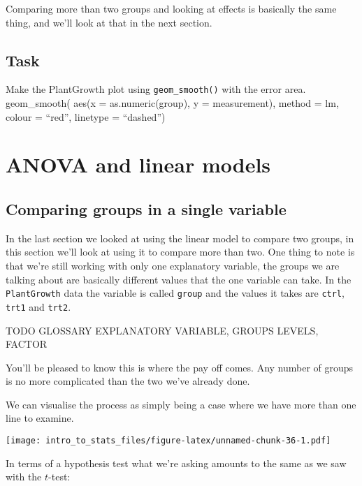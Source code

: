 \documentclass[]{book}
\begin{document}
Comparing more than two groups and looking at effects is basically the same thing, and we'll look at that in the next section.

\hypertarget{task}{%
\section{Task}\label{task}}

Make the PlantGrowth plot using \texttt{geom\_smooth()} with the error area.
geom\_smooth( aes(x = as.numeric(group), y = measurement), method = lm, colour = ``red'', linetype = ``dashed'')

\hypertarget{anova-and-linear-models}{%
\chapter{ANOVA and linear models}\label{anova-and-linear-models}}

\hypertarget{comparing-groups-in-a-single-variable}{%
\section{Comparing groups in a single variable}\label{comparing-groups-in-a-single-variable}}

In the last section we looked at using the linear model to compare two groups, in this section we'll look at using it to compare more than two. One thing to note is that we're still working with only one explanatory variable, the groups we are talking about are basically different values that the one variable can take. In the \texttt{PlantGrowth} data the variable is called \texttt{group} and the values it takes are \texttt{ctrl}, \texttt{trt1} and \texttt{trt2}.

TODO GLOSSARY EXPLANATORY VARIABLE, GROUPS LEVELS, FACTOR

You'll be pleased to know this is where the pay off comes. Any number of groups is no more complicated than the two we've already done.

We can visualise the process as simply being a case where we have more than one line to examine.

\texttt{[image: intro\_to\_stats\_files/figure-latex/unnamed-chunk-36-1.pdf]}

In terms of a hypothesis test what we're asking amounts to the same as we saw with the \(t\)-test:
\end{document}
